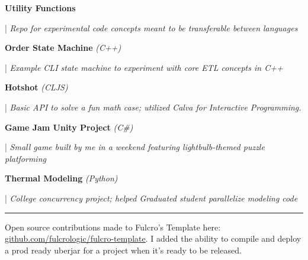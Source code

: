 \documentclass[letterpaper,11pt]{article}
\begin{document}
\begin{minipage}[t]{0.28\textwidth}
	\raggedright
	\textbf{ Utility Functions } \\
\end{minipage}
\hfill
\begin{minipage}[t]{0.70\textwidth}
	\raggedright
	|\textit{ Repo for experimental code concepts meant to be transferable between languages } \\
\end{minipage}

\begin{minipage}[t]{0.28\textwidth}
	\raggedright
	\textbf{ Order State Machine }\textit{(C++)}\\
\end{minipage}
\hfill
\begin{minipage}[t]{0.70\textwidth}
	\raggedright
	|\textit{ Example CLI state machine to experiment with core ETL concepts in C++ } \\
\end{minipage}

\begin{minipage}[t]{0.28\textwidth}
	\raggedright
	\textbf{ Hotshot }\textit{(CLJS)}\\
\end{minipage}
\hfill
\begin{minipage}[t]{0.70\textwidth}
	\raggedright
	|\textit{ Basic API to solve a fun math case; utilized Calva for Interactive Programming.  } \\
\end{minipage}

\begin{minipage}[t]{0.28\textwidth}
	\raggedright
	\textbf{ Game Jam Unity Project }\textit{(C\#)} \\
\end{minipage}
\hfill
\begin{minipage}[t]{0.70\textwidth}
	\raggedright
	|\textit{ Small game built by me in a weekend featuring lightbulb-themed puzzle platforming} \\
\end{minipage}

\begin{minipage}[t]{0.28\textwidth}
	\raggedright
	\textbf{ Thermal Modeling }\textit{(Python)}\\
\end{minipage}
\hfill
\begin{minipage}[t]{0.70\textwidth}
	\raggedright
	|\textit{ College concurrency project; helped Graduated student parallelize modeling code } \\
\end{minipage}
\noindent\rule{19.5cm}{0.4pt}
Open source contributions made to Fulcro’s Template here:
\href{https://github.com/fulcrologic/fulcro-template}{\underline{github.com/fulcrologic/fulcro-template}}. I added the ability to compile and deploy a prod ready uberjar for a project when it's ready to be released.


\end{document}
